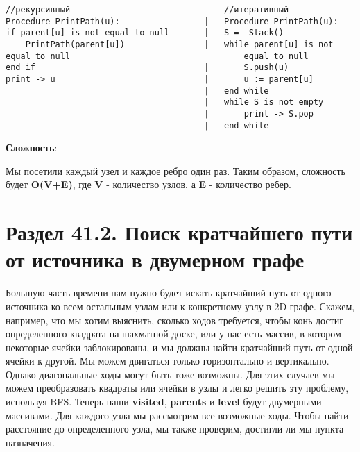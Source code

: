 \begin{tcolorbox}
\begin{verbatim}
//рекурсивный                               //итеративный
Procedure PrintPath(u):                 |   Procedure PrintPath(u):   
if parent[u] is not equal to null       |   S =  Stack()
    PrintPath(parent[u])                |   while parent[u] is not equal to null                                   equal to null
end if                                  |       S.push(u) 
print -> u                              |       u := parent[u]
                                        |   end while
                                        |   while S is not empty
                                        |       print -> S.pop
                                        |   end while

\end{verbatim}
\end{tcolorbox}

\textbf{Сложность}:

\vspace{\baselineskip}

Мы посетили каждый узел и каждое ребро один раз. Таким образом, сложность будет \textbf{O(V+E)}, где \textbf{V} - количество узлов, а \textbf{E} - количество ребер.

\section*{Раздел 41.2. Поиск кратчайшего пути от источника в двумерном графе}

Большую часть времени нам нужно будет искать кратчайший путь от одного источника ко всем остальным узлам или к конкретному узлу в 2D-графе. Скажем, например, что мы хотим выяснить, сколько ходов требуется, чтобы конь достиг определенного квадрата на шахматной доске, или у нас есть массив, в котором некоторые ячейки заблокированы, и мы должны найти кратчайший путь от одной ячейки к другой. Мы можем двигаться только горизонтально и вертикально. Однако диагональные ходы могут быть тоже возможны. Для этих случаев мы можем преобразовать квадраты или ячейки в узлы и легко решить эту проблему, используя BFS. Теперь наши \textbf{visited}, \textbf{parents} и \textbf{level} будут двумерными массивами. Для каждого узла мы рассмотрим все возможные ходы. Чтобы найти расстояние до определенного узла, мы также проверим, достигли ли мы пункта назначения.

\vspace{\baselineskip}

